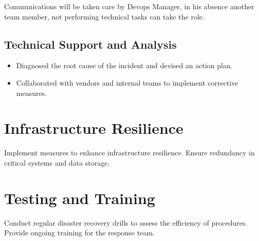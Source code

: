 Communications will be taken care by Devops Manager, in his absence another team member, not performing technical tasks can take the role.

\subsection{Technical Support and Analysis}

\begin{itemize}
    \item Diagnosed the root cause of the incident and devised an action plan.
    \item Collaborated with vendors and internal teams to implement corrective measures.
\end{itemize}

\section{Infrastructure Resilience}
Implement measures to enhance infrastructure resilience.
Ensure redundancy in critical systems and data storage.

\section{Testing and Training}
Conduct regular disaster recovery drills to assess the efficiency of procedures.
Provide ongoing training for the response team.